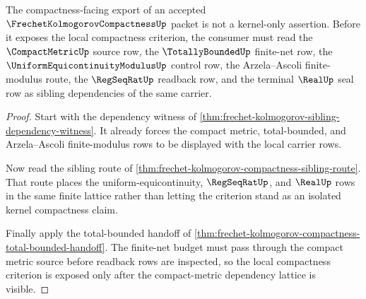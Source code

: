 \begin{theorem}
\label{thm:frechet-kolmogorov-orphan-compact-metric-lattice}
The compactness-facing export of an accepted $\FrechetKolmogorovCompactnessUp$ packet is not a kernel-only assertion. Before it exposes the local compactness criterion, the consumer must read the $\CompactMetricUp$ source row, the $\TotallyBoundedUp$ finite-net row, the $\UniformEquicontinuityModulusUp$ control row, the Arzela--Ascoli finite-modulus route, the $\RegSeqRatUp$ readback row, and the terminal $\RealUp$ seal row as sibling dependencies of the same carrier.
\end{theorem}
\begin{proof}
Start with the dependency witness of \autoref{thm:frechet-kolmogorov-sibling-dependency-witness}. It already forces the compact metric, total-bounded, and Arzela--Ascoli finite-modulus rows to be displayed with the local carrier rows.

Now read the sibling route of \autoref{thm:frechet-kolmogorov-compactness-sibling-route}. That route places the uniform-equicontinuity, $\RegSeqRatUp$, and $\RealUp$ rows in the same finite lattice rather than letting the criterion stand as an isolated kernel compactness claim.

Finally apply the total-bounded handoff of \autoref{thm:frechet-kolmogorov-compactness-total-bounded-handoff}. The finite-net budget must pass through the compact metric source before readback rows are inspected, so the local compactness criterion is exposed only after the compact-metric dependency lattice is visible.
\end{proof}
